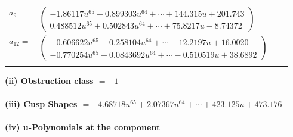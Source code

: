 \documentclass[1p]{elsarticle_modified}
\theoremstyle{definition}
\begin{document}
\begin{tabular}{m{7pt} m{180pt} m{7pt} m{180pt} }
\flushright $a_{9}=$&$\begin{pmatrix}-1.86117 u^{65}+0.899303 u^{64}+\cdots+144.315 u+201.743\\0.488512 u^{65}+0.502843 u^{64}+\cdots+75.8217 u-8.74372\end{pmatrix}$ \\
\flushright $a_{12}=$&$\begin{pmatrix}-0.606622 u^{65}-0.258104 u^{64}+\cdots-12.2197 u+16.0020\\-0.770254 u^{65}-0.0843692 u^{64}+\cdots-0.510519 u+38.6892\end{pmatrix}$\\&\end{tabular}
\flushleft \textbf{(ii) Obstruction class $= -1$}\\~\\
\flushleft \textbf{(iii) Cusp Shapes $= -4.68718 u^{65}+2.07367 u^{64}+\cdots+423.125 u+473.176$}\\~\\
\newpage\renewcommand{\arraystretch}{1}
\flushleft \textbf{(iv) u-Polynomials at the component}\newline \\
\end{document}
